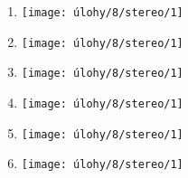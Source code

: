 \begin{enumerate}
	\item
	\begin{minipage}[t]{\linewidth}
		\begin{quote}
			
		\end{quote}
		\centering
		\texttt{[image: úlohy/8/stereo/1]}				
	\end{minipage}
	
	\item
	\begin{minipage}[t]{\linewidth}
		\begin{quote}
			
		\end{quote}
		\centering
		\texttt{[image: úlohy/8/stereo/1]}				
	\end{minipage}
	
	\item
	\begin{minipage}[t]{\linewidth}
		\begin{quote}
			
		\end{quote}
		\centering
		\texttt{[image: úlohy/8/stereo/1]}				
	\end{minipage}
	
	\item
	\begin{minipage}[t]{\linewidth}
		\begin{quote}
			
		\end{quote}
		\centering
		\texttt{[image: úlohy/8/stereo/1]}				
	\end{minipage}
	
	\item
	\begin{minipage}[t]{\linewidth}
		\begin{quote}
			
		\end{quote}
		\centering
		\texttt{[image: úlohy/8/stereo/1]}				
	\end{minipage}
	
	\item
	\begin{minipage}[t]{\linewidth}
		\begin{quote}
			
		\end{quote}
		\centering
		\texttt{[image: úlohy/8/stereo/1]}				
	\end{minipage}
	

\end{enumerate}
